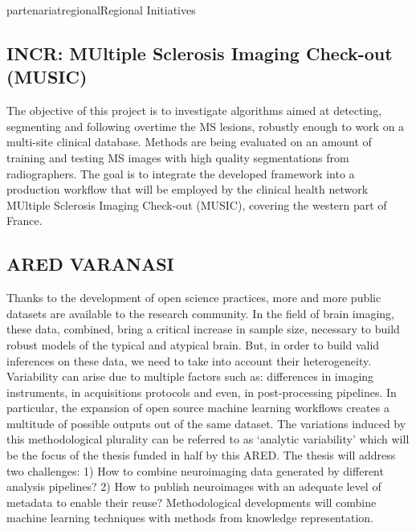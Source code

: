 \documentclass{ra2018}
\begin{document}
\begin{module}{partenariat}{regional}{Regional Initiatives}

\subsection{INCR: MUltiple Sclerosis Imaging Check-out (MUSIC)}
    \begin{participants}
    \end{participants}
The objective of this project is to investigate algorithms aimed at detecting, segmenting and following overtime the MS lesions, robustly enough to work on a multi-site clinical database. Methods are being evaluated on an amount of training and testing MS images with high quality segmentations from radiographers.
The goal is to integrate the developed framework into a production workflow that will be employed by the clinical health network MUltiple Sclerosis Imaging Check-out (MUSIC), covering the western part of France.

\subsection{ARED VARANASI}
    \begin{participants}
    \end{participants}
Thanks to the development of open science practices, more and more public datasets are available to the research community. In the field of brain imaging, these data, combined, bring a critical increase in sample size, necessary to build robust models of the typical and atypical brain.
But, in order to build valid inferences on these data, we need to take into account their heterogeneity. Variability can arise due to multiple factors such as: differences in imaging instruments, in acquisitions protocols and even, in post-processing pipelines. In particular, the expansion of open source machine learning workflows creates a multitude of possible outputs out of the same dataset. The variations induced by this methodological plurality can be referred to as ‘analytic variability’ which will be the focus of the thesis funded in half by this ARED.
The thesis will address two challenges: 1) How to combine neuroimaging data generated by different analysis pipelines? 2) How to publish neuroimages with an adequate level of metadata to enable their reuse? Methodological developments will combine machine learning techniques with methods from knowledge representation. 

\end{module}
\end{document}
